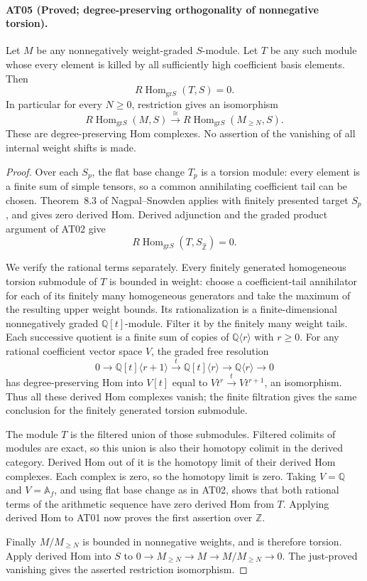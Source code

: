\paragraph{AT05 (Proved; degree-preserving orthogonality of nonnegative torsion).}
Let $M$ be any nonnegatively weight-graded $S$-module.
Let $T$ be any such module whose every element is killed
by all sufficiently high coefficient basis elements.
Then
\[
 R\operatorname{Hom}_{\mathrm{gr}S}(T,S)=0.
\]
In particular for every $N\geq0$, restriction gives an
isomorphism
\[
 R\operatorname{Hom}_{\mathrm{gr}S}(M,S)
 \xrightarrow{\ \cong\ }
 R\operatorname{Hom}_{\mathrm{gr}S}(M_{\geq N},S).
\]
These are degree-preserving Hom complexes. No assertion
of the vanishing of all internal weight shifts is made.

\begin{proof}
Over each $S_p$, the flat base change $T_p$ is a torsion
module: every element is a finite sum of simple tensors,
so a common annihilating coefficient tail can be chosen.
Theorem~8.3 of Nagpal--Snowden applies with finitely
presented target $S_p$, and gives zero derived Hom.
Derived adjunction and the graded product argument of
AT02 give
\[
 R\operatorname{Hom}_{\mathrm{gr}S}
       (T,S_{\widehat{\mathbb Z}})=0.
\]

We verify the rational terms separately. Every finitely
generated homogeneous torsion submodule of $T$ is bounded
in weight: choose a coefficient-tail annihilator for each
of its finitely many homogeneous generators and take the
maximum of the resulting upper weight bounds. Its
rationalization is a finite-dimensional nonnegatively
graded $\mathbb Q[t]$-module. Filter it by the finitely many
weight tails. Each successive quotient is a finite sum
of copies of $\mathbb Q\langle r\rangle$ with $r\geq0$.
For any rational coefficient vector space $V$, the graded
free resolution
\[
 0\longrightarrow\mathbb Q[t]\langle r+1\rangle
 \xrightarrow{t}\mathbb Q[t]\langle r\rangle
 \longrightarrow\mathbb Q\langle r\rangle\longrightarrow0
\]
has degree-preserving Hom into $V[t]$ equal to
$Vt^r\xrightarrow{t}Vt^{r+1}$, an isomorphism.
Thus all these derived Hom complexes vanish; the finite
filtration gives the same conclusion for the finitely
generated torsion submodule.

The module $T$ is the filtered union of those submodules.
Filtered colimits of modules are exact, so this union is
also their homotopy colimit in the derived category.
Derived Hom out of it is the homotopy limit of their
derived Hom complexes. Each complex is zero, so the
homotopy limit is zero. Taking $V=\mathbb Q$ and
$V=\mathbb A_f$, and using flat base change as in AT02,
shows that both rational terms of the arithmetic sequence
have zero derived Hom from $T$. Applying derived Hom to
AT01 now proves the first assertion over $\mathbb Z$.

Finally $M/M_{\geq N}$ is bounded in nonnegative weights,
and is therefore torsion. Apply derived Hom into $S$ to
$0\to M_{\geq N}\to M\to M/M_{\geq N}\to0$.
The just-proved vanishing gives the asserted restriction
isomorphism.
\end{proof}

